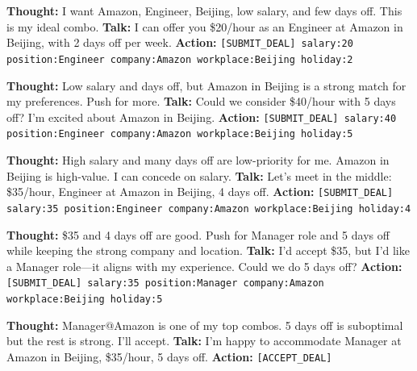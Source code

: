 \documentclass{interact}
\theoremstyle{plain}
\theoremstyle{definition}
\theoremstyle{remark}
\begin{document}
\begin{recruiterbox}
\textbf{Thought:} I want Amazon, Engineer, Beijing, low salary, and few days off. This is my ideal combo.\newline
\textbf{Talk:} I can offer you \$20/hour as an Engineer at Amazon in Beijing, with 2 days off per week.\newline
\textbf{Action:} \texttt{[SUBMIT\_DEAL] salary:20 position:Engineer company:Amazon workplace:Beijing holiday:2}
\end{recruiterbox}

\begin{applicantbox}
\textbf{Thought:} Low salary and days off, but Amazon in Beijing is a strong match for my preferences. Push for more.\newline
\textbf{Talk:} Could we consider \$40/hour with 5 days off? I'm excited about Amazon in Beijing.\newline
\textbf{Action:} \texttt{[SUBMIT\_DEAL] salary:40 position:Engineer company:Amazon workplace:Beijing holiday:5}
\end{applicantbox}

\begin{recruiterbox}
\textbf{Thought:} High salary and many days off are low-priority for me. Amazon in Beijing is high-value. I can concede on salary.\newline
\textbf{Talk:} Let's meet in the middle: \$35/hour, Engineer at Amazon in Beijing, 4 days off.\newline
\textbf{Action:} \texttt{[SUBMIT\_DEAL] salary:35 position:Engineer company:Amazon workplace:Beijing holiday:4}
\end{recruiterbox}

\begin{applicantbox}
\textbf{Thought:} \$35 and 4 days off are good. Push for Manager role and 5 days off while keeping the strong company and location.\newline
\textbf{Talk:} I'd accept \$35, but I'd like a Manager role---it aligns with my experience. Could we do 5 days off?\newline
\textbf{Action:} \texttt{[SUBMIT\_DEAL] salary:35 position:Manager company:Amazon workplace:Beijing holiday:5}
\end{applicantbox}

\begin{recruiterbox}
\textbf{Thought:} Manager@Amazon is one of my top combos. 5 days off is suboptimal but the rest is strong. I'll accept.\newline
\textbf{Talk:} I'm happy to accommodate Manager at Amazon in Beijing, \$35/hour, 5 days off.\newline
\textbf{Action:} \texttt{[ACCEPT\_DEAL]}
\end{recruiterbox}
\end{document}
